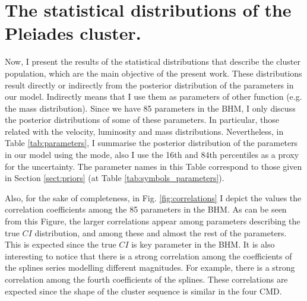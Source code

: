 \section{The statistical distributions of the Pleiades cluster.}
Now, I present the results of the statistical distributions that describe the cluster population, which are the main objective of the present work. These distributions result directly or indirectly from the posterior distribution of the parameters in our model. Indirectly means that I use them as parameters of other function (e.g. the mass distribution). Since we have 85 parameters in the BHM, I only discuss the posterior distributions of some of these parameters. In particular, those related with the velocity, luminosity and mass distributions. Nevertheless, in Table \ref{tab:parameters}, I summarise the posterior distribution of the parameters in our model using the mode, also I use the 16th and 84th percentiles as a proxy for the uncertainty. The parameter names in this Table correspond to those given in Section \ref{sect:priors} (at Table \ref{tab:symbols_parameters}). 

Also, for the sake of completeness, in Fig. \ref{fig:correlations} I depict the values the correlation coefficients among the 85 parameters in the BHM. As can be seen from this Figure, the larger correlations appear among parameters describing the true $CI$ distribution, and  among these and almost the rest of the parameters. This is expected since the true $CI$ is key parameter in the BHM. It is also interesting to notice that there is a strong correlation among the coefficients of the splines series modelling different magnitudes. For example, there is a strong correlation among the fourth coefficients of the splines. These correlations are expected since the shape of the cluster sequence is similar in the four CMD.  




